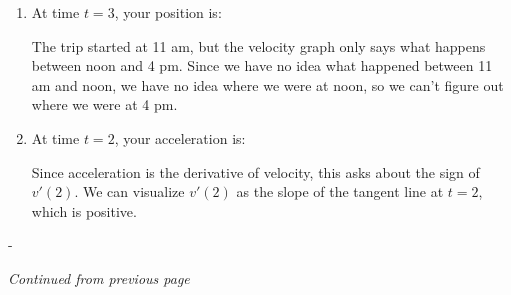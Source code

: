 \documentclass{article}
\makeatletter
\newlength{\tipmargin}
\renewenvironment{framed}{
  \setlength{\tipmargin}{\textwidth-\linewidth}
  \advance\@totalleftmargin-\tipmargin
  \def\FrameCommand{\hspace{\tipmargin}\fbox}%
  \advance\linewidth\tipmargin
  \MakeFramed {\advance\hsize-\width \FrameRestore}%
}
{\endMakeFramed}
\theoremstyle{theorem}
\makeatother
\begin{document}
\begin{enumerate}
\begin{enumerate}
\begin{problem}[\vfill]
    \end{problem}

    \begin{solution}
      We're told that negative velocity indicates traveling south, and we saw in \ref{fall2012-1a-midterm1-2a-i} that our velocity at $t=1$ is negative. 
    \end{solution}

  \item
    \begin{problem}[\vfill]
      At time $t = 3$, your position is: \qquad {} \qquad {} \qquad

    \end{problem}

    \begin{solution}
      The trip started at 11 am, but the velocity graph only says what happens between noon and 4 pm. Since we have no idea what happened between 11 am and noon, we have no idea where we were at noon, so we can't figure out where we were at 4 pm. 
    \end{solution}    

  \item \label{fall2012-1a-midterm1-2a-accel}
    \begin{problem}[\vfill\newpage]
      At time $t = 2$, your acceleration is: \qquad
       \qquad {} \qquad
       \qquad {}

    \end{problem}

    \begin{solution}
      Since acceleration is the derivative of velocity, this asks about the sign of $v'(2)$. We can visualize $v'(2)$ as the slope of the tangent line at $t=2$, which is positive. 
    \end{solution}

  \end{enumerate}

  \begin{problemonly}
    \begin{framed}
      \emph{Continued from previous page}
    \end{framed}
  \end{problemonly}


\end{enumerate}
\end{document}
